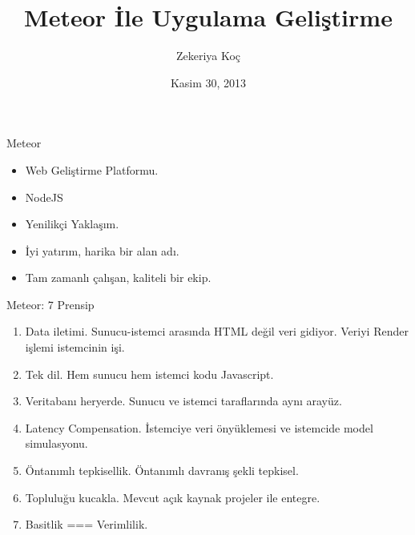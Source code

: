 \documentclass{beamer}
\title[Meteor 101]{Meteor \.{I}le Uygulama Geli\c{s}tirme}
\author{Zekeriya Ko\c{c}}
\institute{Metglobal}
\date{Kasim 30, 2013}
\begin{document}
    \begin{frame}
        \titlepage{}
    \end{frame}

    \begin{frame}{Meteor}
        \begin{itemize}
            \item Web Geliştirme Platformu.
            \item NodeJS
            \item Yenilikçi Yaklaşım.
            \item İyi yatırım, harika bir alan adı.
            \item Tam zamanlı çalışan, kaliteli bir ekip.
        \end{itemize}
    \end{frame}

    \begin{frame}{Meteor: 7 Prensip}
        \begin{enumerate}
            \item Data iletimi. Sunucu-istemci arasında HTML değil veri gidiyor. Veriyi Render işlemi istemcinin işi.
            \item Tek dil. Hem sunucu hem istemci kodu Javascript.
            \item Veritabanı heryerde. Sunucu ve istemci taraflarında aynı arayüz.
            \item Latency Compensation. İstemciye veri önyüklemesi ve istemcide model simulasyonu.
            \item Öntanımlı tepkisellik. Öntanımlı davranış şekli tepkisel.
            \item Topluluğu kucakla. Mevcut açık kaynak projeler ile entegre.
            \item Basitlik === Verimlilik.
        \end{enumerate}
    \end{frame}
\end{document}
